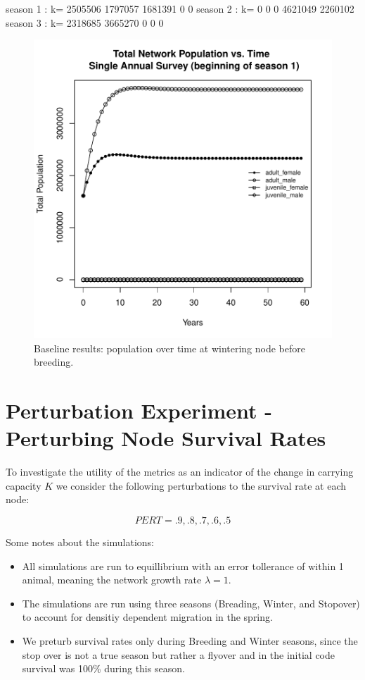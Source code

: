 \documentclass[10pt]{article}
\begin{document}
\begin{Schunk}
\begin{Soutput}
season 1 : k= 2505506 1797057 1681391 0 0
season 2 : k= 0 0 0 4621049 2260102
season 3 : k= 2318685 3665270 0 0 0
\end{Soutput}
\end{Schunk}



\begin{figure}[H]
\begin{center}
\includegraphics[width=.7\textwidth, height=.6\textwidth]{RGraphics-pintailbaseline}
\caption{Baseline results: population over time at wintering node before breeding.}\label{fig:pintailbaseline}
\end{center}
\end{figure}

\clearpage


\section{Perturbation Experiment - Perturbing Node Survival Rates}

To investigate the utility of the metrics as an indicator of the change in carrying capacity $K$ we consider the following perturbations to the survival rate at each node:

\[PERT = .9, .8, .7, .6, .5\]

Some notes about the simulations:
\begin{itemize}
\item All simulations are run to equillibrium with an error tollerance of within 1 animal, meaning the network growth rate $\lambda=1$.
\item The simulations are run using three seasons (Breading, Winter, and Stopover) to account for densitiy dependent migration in the spring.
\item We preturb survival rates only during Breeding and Winter seasons, since the stop over is not a true season but rather a flyover and in the initial code survival was 100\% during this season.
\end{itemize}
%  
\end{document}
